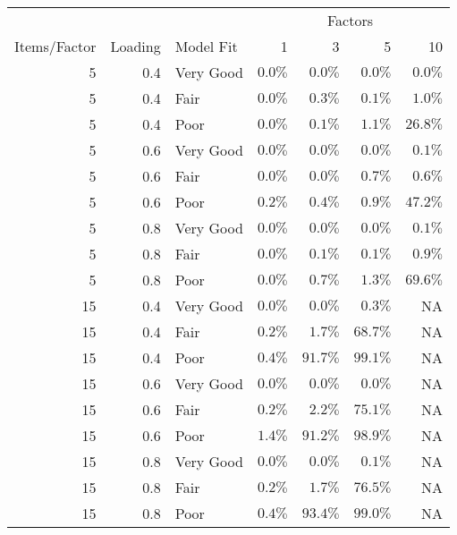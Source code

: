 \captionsetup[table]{labelformat=empty,skip=1pt}
\begin{longtable}{rrlrrrr}
\toprule
 &  &  & \multicolumn{4}{c}{Factors} \\ 
 \cmidrule(lr){4-7}
Items/Factor & Loading & Model Fit & 1 & 3 & 5 & 10 \\ 
\midrule
5 & 0.4 & Very Good & $0.0\%$ & $0.0\%$ & $0.0\%$ & $0.0\%$ \\ 
5 & 0.4 & Fair & $0.0\%$ & $0.3\%$ & $0.1\%$ & $1.0\%$ \\ 
5 & 0.4 & Poor & $0.0\%$ & $0.1\%$ & $1.1\%$ & $26.8\%$ \\ 
5 & 0.6 & Very Good & $0.0\%$ & $0.0\%$ & $0.0\%$ & $0.1\%$ \\ 
5 & 0.6 & Fair & $0.0\%$ & $0.0\%$ & $0.7\%$ & $0.6\%$ \\ 
5 & 0.6 & Poor & $0.2\%$ & $0.4\%$ & $0.9\%$ & $47.2\%$ \\ 
5 & 0.8 & Very Good & $0.0\%$ & $0.0\%$ & $0.0\%$ & $0.1\%$ \\ 
5 & 0.8 & Fair & $0.0\%$ & $0.1\%$ & $0.1\%$ & $0.9\%$ \\ 
5 & 0.8 & Poor & $0.0\%$ & $0.7\%$ & $1.3\%$ & $69.6\%$ \\ 
15 & 0.4 & Very Good & $0.0\%$ & $0.0\%$ & $0.3\%$ & NA \\ 
15 & 0.4 & Fair & $0.2\%$ & $1.7\%$ & $68.7\%$ & NA \\ 
15 & 0.4 & Poor & $0.4\%$ & $91.7\%$ & $99.1\%$ & NA \\ 
15 & 0.6 & Very Good & $0.0\%$ & $0.0\%$ & $0.0\%$ & NA \\ 
15 & 0.6 & Fair & $0.2\%$ & $2.2\%$ & $75.1\%$ & NA \\ 
15 & 0.6 & Poor & $1.4\%$ & $91.2\%$ & $98.9\%$ & NA \\ 
15 & 0.8 & Very Good & $0.0\%$ & $0.0\%$ & $0.1\%$ & NA \\ 
15 & 0.8 & Fair & $0.2\%$ & $1.7\%$ & $76.5\%$ & NA \\ 
15 & 0.8 & Poor & $0.4\%$ & $93.4\%$ & $99.0\%$ & NA \\ 
 \bottomrule
\end{longtable}

